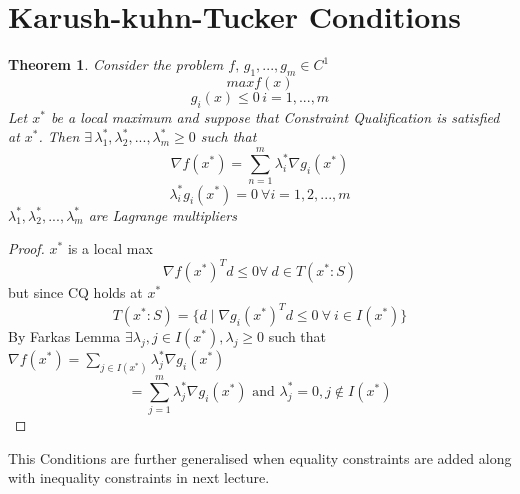 \documentclass[twoside]{article}
\newcounter{lecnum}
\newtheorem{theorem}{Theorem}[lecnum]
\begin{document}
\section{Karush-kuhn-Tucker Conditions}
\begin{theorem}
Consider the problem $f,\,g_1,...,g_m \in C^{1}$ 
$$max f(x) $$
$$ g_i(x) \leq 0 \, i=1,...,m $$
Let $x^*$ be a local maximum and suppose that Constraint Qualification is satisfied at $x^*$. Then $ \exists \, \lambda_1^*,\lambda_2^*,...,\lambda_m^* \geq 0 $ such that \begin{equation}
\nabla f(x^*) = \sum_{n=1}^{m} \lambda_i^* \nabla g_i(x^*)
\end{equation}
\begin{equation}
\lambda_i^*g_i(x^*) = 0 \ \forall i = 1,2,...,m 
\end{equation}
 $  \lambda_1^*,\lambda_2^*,...,\lambda_m^* $ are Lagrange multipliers
\end{theorem}
\begin{proof}
$x^* $ is a local max\\
$$\nabla f(x^*)^{T}d \leq 0 \forall \  d\in T(x^*:S)$$
but since CQ holds at $x^*$
$$T(x^*:S) = \{ d \mid \nabla g_i(x^*)^{T}d \leq 0\  \forall\  i \in I(x^*)\}$$
By Farkas Lemma $\exists \lambda_j, j \in I(x^*),\lambda_j \geq 0 $ such that $\nabla f(x^*) = \sum_{j\in I(x^*)} \lambda_j^* \nabla g_i(x^*)$\\
$$ =\sum_{j=1}^m \lambda_j^* \nabla g_i(x^*)\text{ and }\lambda_j^* = 0 , j\notin I(x^*)$$
\end{proof}

This Conditions are further generalised when equality constraints are added along with inequality constraints in next lecture.
\end{document}

